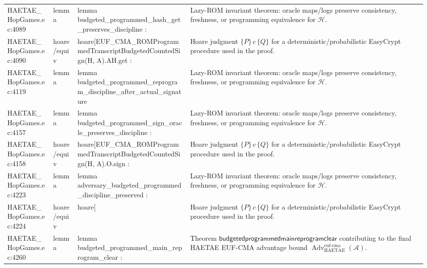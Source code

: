 \documentclass[10pt]{article}
\newcommand{\Adv}{\operatorname{Adv}}
\begin{document}
\begin{longtable}{L{0.11\textwidth}L{0.055\textwidth}L{0.385\textwidth}L{0.41\textwidth}}
HAETAE\_\allowbreak{}HopGames.\allowbreak{}ec:\allowbreak{}4089 & lemma & {\ttfamily\scriptsize lemma budgeted\_\allowbreak{}programmed\_\allowbreak{}hash\_\allowbreak{}get\_\allowbreak{}preserves\_\allowbreak{}discipline :} & Lazy-ROM invariant theorem: oracle maps/logs preserve consistency, freshness, or programming equivalence for $\mathcal H$. \\
HAETAE\_\allowbreak{}HopGames.\allowbreak{}ec:\allowbreak{}4090 & hoare/equiv & {\ttfamily\scriptsize hoare[EUF\_\allowbreak{}CMA\_\allowbreak{}ROMProgrammedTranscriptBudgetedCountedSign(H, A).AH.get :} & Hoare judgment $\{P\}\,c\,\{Q\}$ for a deterministic/probabilistic EasyCrypt procedure used in the proof. \\
HAETAE\_\allowbreak{}HopGames.\allowbreak{}ec:\allowbreak{}4119 & lemma & {\ttfamily\scriptsize lemma budgeted\_\allowbreak{}programmed\_\allowbreak{}reprogram\_\allowbreak{}discipline\_\allowbreak{}after\_\allowbreak{}actual\_\allowbreak{}signature} & Lazy-ROM invariant theorem: oracle maps/logs preserve consistency, freshness, or programming equivalence for $\mathcal H$. \\
HAETAE\_\allowbreak{}HopGames.\allowbreak{}ec:\allowbreak{}4157 & lemma & {\ttfamily\scriptsize lemma budgeted\_\allowbreak{}programmed\_\allowbreak{}sign\_\allowbreak{}oracle\_\allowbreak{}preserves\_\allowbreak{}discipline :} & Lazy-ROM invariant theorem: oracle maps/logs preserve consistency, freshness, or programming equivalence for $\mathcal H$. \\
HAETAE\_\allowbreak{}HopGames.\allowbreak{}ec:\allowbreak{}4158 & hoare/equiv & {\ttfamily\scriptsize hoare[EUF\_\allowbreak{}CMA\_\allowbreak{}ROMProgrammedTranscriptBudgetedCountedSign(H, A).O.sign :} & Hoare judgment $\{P\}\,c\,\{Q\}$ for a deterministic/probabilistic EasyCrypt procedure used in the proof. \\
HAETAE\_\allowbreak{}HopGames.\allowbreak{}ec:\allowbreak{}4223 & lemma & {\ttfamily\scriptsize lemma adversary\_\allowbreak{}budgeted\_\allowbreak{}programmed\_\allowbreak{}discipline\_\allowbreak{}preserved :} & Lazy-ROM invariant theorem: oracle maps/logs preserve consistency, freshness, or programming equivalence for $\mathcal H$. \\
HAETAE\_\allowbreak{}HopGames.\allowbreak{}ec:\allowbreak{}4224 & hoare/equiv & {\ttfamily\scriptsize hoare[} & Hoare judgment $\{P\}\,c\,\{Q\}$ for a deterministic/probabilistic EasyCrypt procedure used in the proof. \\
HAETAE\_\allowbreak{}HopGames.\allowbreak{}ec:\allowbreak{}4260 & lemma & {\ttfamily\scriptsize lemma budgeted\_\allowbreak{}programmed\_\allowbreak{}main\_\allowbreak{}reprogram\_\allowbreak{}clear :} & Theorem $\mathsf{budgetedprogrammedmainreprogramclear}$ contributing to the final HAETAE EUF-CMA advantage bound $\Adv_{\mathrm{HAETAE}}^{\mathrm{euf\mbox{-}cma}}(\mathcal A)$. \\

\end{longtable}
\end{document}
